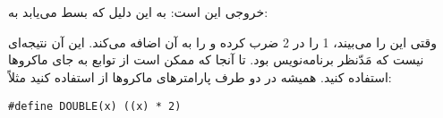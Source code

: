 \section{}
\paragraph{}\label{answer:46}
خروجی این است:
\LTR\noindent
{}
\RTL
به این دلیل که  بسط می‌یابد به:

وقتی  این را می‌بیند، 1 را در 2 ضرب کرده و  را به آن اضافه می‌کند. این آن نتیجه‌ای نیست که مَدّنظر برنامه‌نویس بود. تا آنجا که ممکن است از توابع  به جای ماکروها استفاده کنید. همیشه در دو طرف پارامترهای ماکروها از \lr{\texttt{()}} استفاده کنید مثلاً:
\begin{LTR}
        \begin{lstlisting}[style=C++Style]
            #define DOUBLE(x) ((x) * 2)
        \end{lstlisting}
\end{LTR}